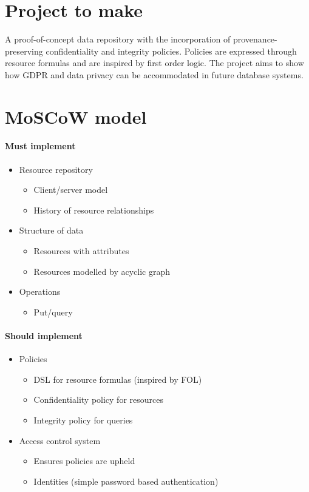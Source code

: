 \section{Project to make}
A proof-of-concept data repository with the incorporation of provenance-preserving confidentiality and integrity policies. Policies are expressed through resource formulas and are inspired by first order logic. The project aims to show how GDPR and data privacy can be accommodated in future database systems.

\section{MoSCoW model}
\paragraph{Must implement}
\begin{itemize}
    \item Resource repository
    \begin{itemize}
        \item Client/server model
        \item History of resource relationships
    \end{itemize}
    \item Structure of data
    \begin{itemize}
        \item Resources with attributes
        \item Resources modelled by acyclic graph
    \end{itemize}
    \item Operations
    \begin{itemize}
        \item Put/query
    \end{itemize}
\end{itemize}

\paragraph{Should implement}
\begin{itemize}
    \item Policies
    \begin{itemize}
        \item DSL for resource formulas (inspired by FOL)
        \item Confidentiality policy for resources
        \item Integrity policy for queries
    \end{itemize}
    \item Access control system
    \begin{itemize}
        \item Ensures policies are upheld
        \item Identities (simple password based authentication)
    \end{itemize}
\end{itemize}

